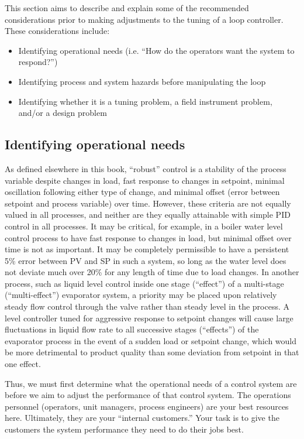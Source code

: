 \filbreak

This section aims to describe and explain some of the recommended considerations prior to making adjustments to the tuning of a loop controller.  These considerations include:

\begin{itemize}
\item Identifying operational needs (i.e. ``How do the operators want the system to respond?'')
\item Identifying process and system hazards before manipulating the loop
\item Identifying whether it is a tuning problem, a field instrument problem, and/or a design problem
\end{itemize}





\filbreak
\subsection{Identifying operational needs}

As defined elsewhere in this book, ``robust'' control is a stability of the process variable despite changes in load, fast response to changes in setpoint, minimal oscillation following either type of change, and minimal offset (error between setpoint and process variable) over time.  However, these criteria are not equally valued in all processes, and neither are they equally attainable with simple PID control in all processes.  It may be critical, for example, in a boiler water level control process to have fast response to changes in load, but minimal offset over time is not as important.  It may be completely permissible to have a persistent 5\% error between PV and SP in such a system, so long as the water level does not deviate much over 20\% for any length of time due to load changes.  In another process, such as liquid level control inside one stage (``effect'') of a multi-stage (``multi-effect'') evaporator system, a priority may be placed upon relatively steady flow control through the valve rather than steady level in the process.  A level controller tuned for aggressive response to setpoint changes will cause large fluctuations in liquid flow rate to all successive stages (``effects'') of the evaporator process in the event of a sudden load or setpoint change, which would be more detrimental to product quality than some deviation from setpoint in that one effect.

Thus, we must first determine what the operational needs of a control system are before we aim to adjust the performance of that control system.  The operations personnel (operators, unit managers, process engineers) are your best resources here.  Ultimately, they are your ``internal customers.''  Your task is to give the customers the system performance they need to do their jobs best.

